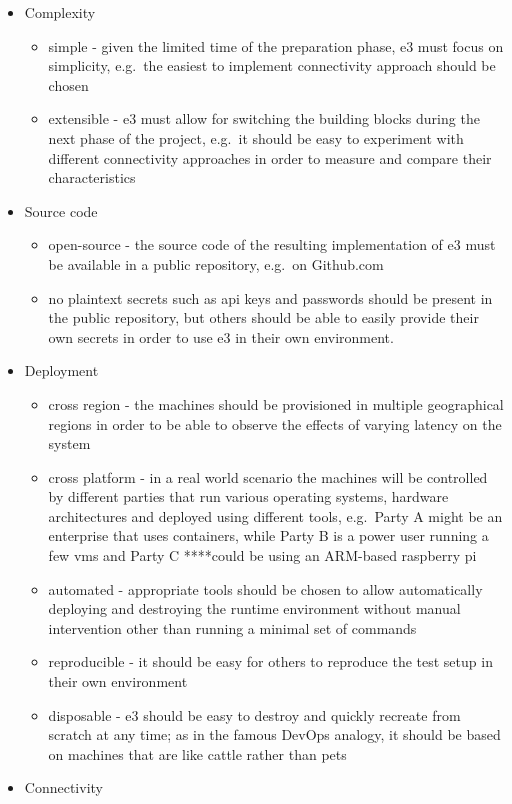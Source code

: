 \begin{itemize}
\tightlist
\item
  Complexity

  \begin{itemize}
  \tightlist
  \item
    simple - given the limited time of the preparation phase, \gls{e3}
    must focus on simplicity, e.g.~the easiest to implement connectivity
    approach should be chosen
  \item
    extensible - \gls{e3} must allow for switching the building blocks
    during the next phase of the project, e.g.~it should be easy to
    experiment with different connectivity approaches in order to
    measure and compare their characteristics
  \end{itemize}
\item
  Source code

  \begin{itemize}
  \tightlist
  \item
    open-source - the source code of the resulting implementation of
    \gls{e3} must be available in a public repository, e.g.~on
    Github.com
  \item
    no plaintext secrets such as \gls{api} keys and passwords should be
    present in the public repository, but others should be able to
    easily provide their own secrets in order to use \gls{e3} in their
    own environment.
  \end{itemize}
\item
  Deployment

  \begin{itemize}
  \tightlist
  \item
    cross region - the machines should be provisioned in multiple
    geographical regions in order to be able to observe the effects of
    varying latency on the system
  \item
    cross platform - in a real world scenario the machines will be
    controlled by different parties that run various operating systems,
    hardware architectures and deployed using different tools,
    e.g.~Party A might be an enterprise that uses containers, while
    Party B is a power user running a few \glspl{vm} and Party C
    ****could be using an ARM-based raspberry pi
  \item
    automated - appropriate tools should be chosen to allow
    automatically deploying and destroying the runtime environment
    without manual intervention other than running a minimal set of
    commands
  \item
    reproducible - it should be easy for others to reproduce the test
    setup in their own environment
  \item
    disposable - \gls{e3} should be easy to destroy and quickly recreate
    from scratch at any time; as in the famous DevOps
    analogy\autocite{biasHistoryPetsVs2016}, it should be based on
    machines that are like cattle rather than pets
  \end{itemize}
\item
  Connectivity


\end{itemize}
